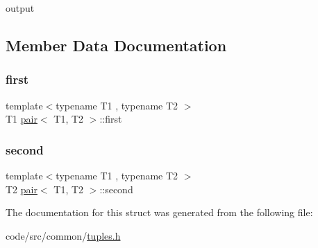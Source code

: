 output 



\subsection{Member Data Documentation}
\mbox{\label{structpair_aed925258783c91efbc5432030709d54e}} 
\subsubsection{\texorpdfstring{first}{first}}
{\footnotesize\ttfamily template$<$typename T1 , typename T2 $>$ \\
T1 \hyperlink{structpair}{pair}$<$ T1, T2 $>$\+::first}

\mbox{\label{structpair_a63ae1bbd5a6ce6bd6167b5359fa7a01f}} 
\subsubsection{\texorpdfstring{second}{second}}
{\footnotesize\ttfamily template$<$typename T1 , typename T2 $>$ \\
T2 \hyperlink{structpair}{pair}$<$ T1, T2 $>$\+::second}



The documentation for this struct was generated from the following file\+:\begin{DoxyCompactItemize}
\item 
code/src/common/\hyperlink{tuples_8h}{tuples.\+h}\end{DoxyCompactItemize}
